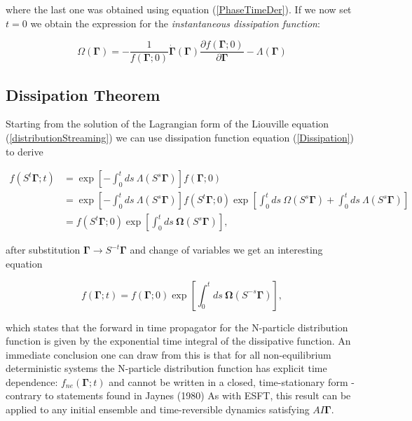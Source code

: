 \documentclass[a4paper,12pt,nofootinbib]{article}
\begin{document}
where the last one was obtained using equation (\ref{PhaseTimeDer}). 
If we now set $t=0$ we obtain the expression for the \textit{instantaneous dissipation function}:

\begin{equation}
  \Omega(\bm{\Gamma})=-\frac{1}{f(\bm{\Gamma};0)}\dot{\bm{\Gamma}}(\bm{\Gamma})\frac{\partial{f(\bm{\Gamma};0)}}{\partial{\bm{\Gamma}}}-\Lambda(\bm{\Gamma})
\end{equation}

\subsection{Dissipation Theorem}

Starting from the solution of the Lagrangian form of the Liouville equation (\ref{distributionStreaming}) we can use dissipation function equation (\ref{Dissipation}) to derive

\begin{equation}
\begin{aligned}
  f(S^t\bm{\Gamma};t) &= \exp[-\int_0^t ds\ \Lambda(S^s\bm{\Gamma})]f(\bm{\Gamma};0)\\
  &=\exp[-\int_0^t ds\ \Lambda(S^s\bm{\Gamma})]f(S^t \bm{\Gamma};0) \exp[\int_0^t ds\ \Omega(S^s \bm{\Gamma}) + \int_0^t ds\ \Lambda(S^s\bm{\Gamma})]\\
  &=f(S^t \bm{\Gamma};0) \exp[\int_0^t ds\ \bm{\Omega}(S^s \bm{\Gamma})],
\end{aligned}
\end{equation}

after substitution $\bm{\Gamma} \to S^{-t}\bm{\Gamma}$ and change of variables we get an interesting equation

\begin{equation}
\label{distributionPropagator}
    f(\bm{\Gamma};t)=f(\bm{\Gamma};0)\exp[\int_0^t ds\ \bm{\Omega}(S^{-s} \bm{\Gamma})],
\end{equation}

which states that the forward in time propagator for the N-particle distribution function is given by the exponential time integral of the dissipative function. 
An immediate conclusion one can draw from this is that for all non-equilibrium deterministic systems the N-particle distribution function has explicit time dependence: $f_{ne}(\bm{\Gamma};t)$ and cannot be written in a closed, time-stationary form - contrary to statements found in Jaynes (1980)
As with ESFT, this result can be applied to any initial ensemble and time-reversible dynamics satisfying $AI\bm{\Gamma}$.
\end{document}

